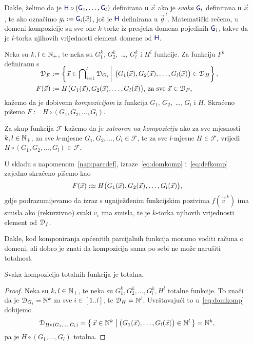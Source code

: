 Dakle, želimo da je $\f H\circ(\f G_1,\dotsc,\f G_l)$ definirana u $\vec x$ ako je \emph{svaka} $\f G_i$ definirana u $\vec x$, te ako označimo $g_i:=\f G_i(\vec x)$, još je $\f H$ definirana u $\vec g^{\,l}$. Matematički rečeno, u domeni kompozicije su sve one $k$-torke iz presjeka domena pojedinih $\f G_i$, takve da je $l$-torka njihovih vrijednosti element domene od $\f H$.
\begin{definicija}[{name=[kompozicija]}]
Neka su $k,l\in{\mathbb N}_+$, te neka su $G_1^k$, $G_2^k$,~\ldots, $G_l^k$ i $H^l$ funkcije. Za funkciju $F^k$ definiranu s
\begin{align}
\SwapAboveDisplaySkip
\label{eq:domkomp}
    \dom{F}&:=\left\{\vec x\in\bigcap\nolimits_{i=1}^l\dom{G_i}\;\middle|\;\bigl(G_1(\vec x),G_2(\vec x),\dotsc,G_l(\vec x)\bigr)\in\dom{H}\right\}\text,\\
\label{eq:defkomp}
    F(\vec x)&:=H\bigl(G_1(\vec x),G_2(\vec x),\dotsc,G_l(\vec x)\bigr)\text{, za sve $\vec x\in\dom F$,}
\end{align}
kažemo da je dobivena \emph{kompozicijom} iz funkcija $G_1$, $G_2$,~\ldots, $G_l$ i $H$. Skraćeno pišemo $F:=H\circ(G_1,G_2,\dotsc,G_l)$. %

Za skup funkcija $\mathcal F$ kažemo da je \emph{zatvoren na kompoziciju} ako za sve mjesnosti $k,l\in{\mathbb N}_+$, za sve $k$-mjesne $G_1,G_2,\dotsc,G_l\in\mathcal F$, te za sve $l$-mjesne $H\in\mathcal F$, vrijedi $H\circ(G_1,G_2,\dotsc,G_l)\in\mathcal F$.
\end{definicija}
U skladu s napomenom~\ref{nap:parcdef}, izraze~\eqref{eq:domkomp} i~\eqref{eq:defkomp} zajedno skraćeno pišemo kao
\begin{equation}
    F(\vec x):\simeq H\bigl(G_1(\vec x),G_2(\vec x),\dotsc,G_l(\vec x)\bigr)\text,
\end{equation}
gdje podrazumijevamo da izraz s ugniježđenim funkcijskim pozivima $f(\vec v^{\,k})$ ima smisla ako (rekurzivno) svaki $v_i$ ima smisla, te je $k$-torka njihovih vrijednosti element od $\mathcal D_{f}$.

Dakle, kod komponiranja općenitih parcijalnih funkcija moramo voditi računa o domeni, ali dobro je znati da kompozicija sama po sebi ne može narušiti totalnost.

\begin{propozicija}[{name=[totalnost kompozicije totalnih funkcija]}]\label{prop:comptot}
Svaka kompozicija totalnih funkcija je totalna.
\end{propozicija}
\begin{proof}
Neka su $k,l\in{\mathbb N}_+$, te neka su $G_1^k,G_2^k,\dotsc,G_l^k,H^l$ totalne funkcije. To znači da je $\mathcal D_{G_i}={\mathbb N}^k$ za sve $i\in[1..l]$, te $\mathcal D_{H}={\mathbb N}^l$. Uvrštavajući to u~\eqref{eq:domkomp} dobijemo
\begin{equation}
    \mathcal D_{H\circ(G_1,\dots,G_l)}=\left\{\,\vec x\in{\mathbb N}^k\;\middle|\;\bigl(G_1(\vec x),\dotsc,G_l(\vec x)\bigr)\in{\mathbb N}^l\,\right\}={\mathbb N}^k\text,
\end{equation}
pa je $H\circ(G_1,\dotsc,G_l)$ totalna.
\end{proof}

